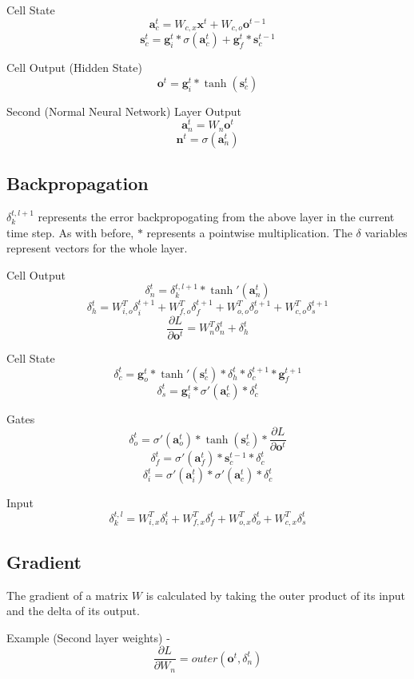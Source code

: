 \documentclass[11pt]{article}
\begin{document}
Cell State
\[ \textbf{a}_{c}^{t} = W_{c,x}\textbf{x}^{t} +  W_{c,o}\textbf{o}^{t-1} \] 
\[ \textbf{s}_{c}^{t} =  \textbf{g}_{i}^{t} * \sigma( \textbf{a}_{c}^{t}) + \textbf{g}_{f}^{t}*\textbf{s}_{c}^{t-1} \]

Cell Output (Hidden State)
\[ \textbf{o}^{t} =  \textbf{g}_{i}^{t} * \tanh( \textbf{s}_{c}^{t}) \]

Second (Normal Neural Network) Layer Output
\[ \textbf{a}_{n}^{t} = W_{n}\textbf{o}^{t} \]
\[ \textbf{n}^{t} = \sigma( \textbf{a}_{n}^{t}) \]

\subsection{Backpropagation}
\(\delta_{k}^{t,l+1}\) represents the error backpropogating from the above layer
in the current time step. 
As with before, \(*\) represents a pointwise multiplication. The \(\delta\) variables
represent vectors for the whole layer.

Cell Output
\[  \delta_{n}^{t} = \delta_{k}^{t,l+1}*\tanh'({\textbf{a}_{n}^{t}}) \]
\[ \delta_{h}^{t} = W_{i,o}^{T}\delta_{i}^{t+1} +  W_{f,o}^{T}\delta_{f}^{t+1} +  W_{o,o}^{T}\delta_{o}^{t+1} +  W_{c,o}^{T}\delta_{s}^{t+1} \]
\[ \frac{\partial L}{\partial \textbf{o}^{t}} = W_{n}^{T} \delta_{n}^{t} +  \delta_{h}^{t} \]

Cell State
\[ \delta_{c}^{t} = \textbf{g}_{o}^{t} * \tanh'({\textbf{s}_{c}^{t}}) * \delta_{h}^{t} * \delta_{c}^{t+1} * \textbf{g}_{f}^{t+1} \]
\[ \delta_{s}^{t} = \textbf{g}_{i}^{t} * \sigma'(\textbf{a}_{c}^{t}) * \delta_{c}^{t} \]

Gates
\[ \delta_{o}^{t} = \sigma'(\textbf{a}_{o}^{t}) * \tanh( \textbf{s}_{c}^{t}) * \frac{\partial L}{\partial \textbf{o}^{t}} \]
\[ \delta_{f}^{t} = \sigma'(\textbf{a}_{f}^{t}) * \textbf{s}_{c}^{t-1} * \delta_{c}^{t} \]
\[ \delta_{i}^{t} = \sigma'(\textbf{a}_{i}^{t}) * \sigma'( \textbf{a}_{c}^{t}) * \delta_{c}^{t} \]

Input
\[  \delta_{k}^{t,l} = W_{i,x}^{T}\delta_{i}^{t} +  W_{f,x}^{T}\delta_{f}^{t} +  W_{o,x}^{T}\delta_{o}^{t} +  W_{c,x}^{T}\delta_{s}^{t} \]

\subsection{Gradient}

The gradient of a matrix \(W\) is calculated by
taking the outer product of its input and the delta
of its output.

Example (Second layer weights) - 
\[ \frac{\partial L}{\partial W_{n}} = outer(\textbf{o}^{t}, \delta_{n}^{t} ) \]
\end{document}
